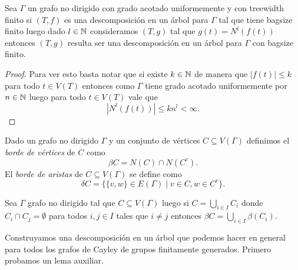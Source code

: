 \documentclass[tesis.tex]{subfiles}
\begin{document}
\medskip

\begin{coro}\label{coro_vecinos_bagsize_grado}
	Sea $\Gamma$ un grafo no dirigido con grado acotado uniformemente y con treewidth finito si $(T,f)$ es una descomposición en un árbol para $\Gamma$ tal que tiene bagsize finito luego dado $l \in \mathbb{N}$ consideramos $(T,g)$ tal que $g(t) = N^l(f(t))$ entonces $(T,g)$ resulta ser una descomposición en un árbol para $\Gamma$ con bagsize finito.
\end{coro}
\begin{proof}
	Para ver esto basta notar que si existe $k \in \mathbb{N}$ de manera que  $|f(t)| \le k$ para todo $t \in V(T)$ entonces como $\Gamma$ tiene grado acotado uniformemente por $n \in \mathbb{N}$ luego para todo $t \in V(T)$ vale que
	\[
		|N^{l} (f(t))| \le kn^{l} < \infty.
	\]
	
\end{proof}

\begin{deff}
	Dado un grafo no dirigido $\Gamma$ y un conjunto de vértices $C \subseteq V(\Gamma)$ definimos el \emph{borde de vértices} de $C$ como
	\[
	\beta C =  N(C) \cap N({ C^{c}}).
	\] 
	El \emph{borde de aristas} de $C \subseteq V(\Gamma)$ se define como
	\[
	\delta C = \{  \{v,w \} \in E(\Gamma) \mid v \in C, w \in  C^{c}    \}.
	\]
\end{deff}
\begin{obs}
	\label{obs:beta_separa_componentes}
	Sea $\Gamma$ grafo no dirigido tal que $C \subseteq V(\Gamma)$ luego si  $C = \bigcup_{i \in I} C_{i}$ donde $C_{i} \cap C_{j} = \emptyset$ para todos $i,j \in I$ tales que $i \neq j$ entonces $\beta C = \bigcup_{i \in I} \beta(C_{i})$.
\end{obs}

Construyamos una descomposición en un árbol que podemos hacer en general para todos los grafos de Cayley de grupos finitamente generados. 
Primero probamos un lema auxiliar.
\newpage
\end{document}
